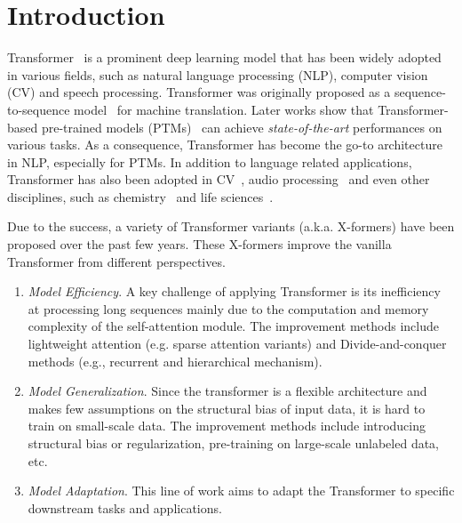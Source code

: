 \documentclass[manuscript,acmsmall,screen,nonacm]{acmart}
\theoremstyle{definition}
\begin{document}



\maketitle

\section{Introduction}\label{sec:intro}

Transformer~\cite{vaswani2017attention} is a prominent deep learning model that has been widely adopted in various fields, such as natural language processing (NLP), computer vision (CV) and speech processing. Transformer was originally proposed as a sequence-to-sequence model~\cite{sutskever14seq2seq} for machine translation. Later works show that Transformer-based pre-trained models (PTMs)~\cite{qiu2020ptms} can achieve \textit{state-of-the-art} performances on various tasks. As a consequence, Transformer has become the go-to architecture in NLP, especially for PTMs. In addition to language related applications, Transformer has also been adopted in CV~\cite{parmar2018imagexformer,carion20detr,dosovitskiy2020vit}, audio processing~\cite{dong18speechxformer,gulati20conformer,chen20streamingxformer} and even other disciplines, such as chemistry~\cite{schwaller19olecularxformer} and life sciences~\cite{rivese21biological}.

Due to the success, a variety of Transformer variants (a.k.a. X-formers) have been proposed over the past few years.
These X-formers improve the vanilla Transformer from different perspectives.
\begin{enumerate}
  \item \textit{Model Efficiency}. A key challenge of applying Transformer is its inefficiency at processing long sequences mainly due to the computation and memory complexity of the self-attention module.
The improvement methods include lightweight attention (e.g. sparse attention variants) and Divide-and-conquer methods (e.g., recurrent and hierarchical mechanism).
  \item \textit{Model Generalization}. Since the transformer is a flexible architecture and makes few assumptions on the structural bias of input data, it is hard to train on small-scale data. The improvement methods include introducing structural bias or regularization, pre-training on large-scale unlabeled data, etc.
  \item \textit{Model Adaptation}. This line of work aims to adapt the Transformer to specific downstream tasks and applications.
\end{enumerate}
\end{document}
